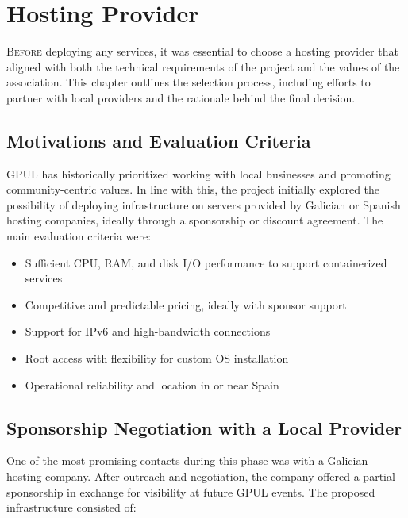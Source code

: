 %

\chapter{Hosting Provider}
\label{chap:hosting-provider}

\lettrine{B}{efore} deploying any services, it was essential to choose a hosting provider that aligned with both the technical requirements of the project and the values of the association. This chapter outlines the selection process, including efforts to partner with local providers and the rationale behind the final decision.

\section{Motivations and Evaluation Criteria}

GPUL has historically prioritized working with local businesses and promoting community-centric values. In line with this, the project initially explored the possibility of deploying infrastructure on servers provided by Galician or Spanish hosting companies, ideally through a sponsorship or discount agreement. The main evaluation criteria were:

\begin{itemize}
  \item Sufficient CPU, RAM, and disk I/O performance to support containerized services
  \item Competitive and predictable pricing, ideally with sponsor support
  \item Support for IPv6 and high-bandwidth connections
  \item Root access with flexibility for custom OS installation
  \item Operational reliability and location in or near Spain
\end{itemize}

\section{Sponsorship Negotiation with a Local Provider}

One of the most promising contacts during this phase was with a Galician hosting company. After outreach and negotiation, the company offered a partial sponsorship in exchange for visibility at future GPUL events. The proposed infrastructure consisted of:

